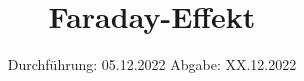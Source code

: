 

\subject{Versuch Nr.V46}
\title{Faraday-Effekt}
\date{%
  Durchführung: 05.12.2022
  \hspace{3em}
  Abgabe: XX.12.2022
}



\maketitle
\thispagestyle{empty}
\tableofcontents
\newpage 






%

\nocite{*}

\printbibliography{}


